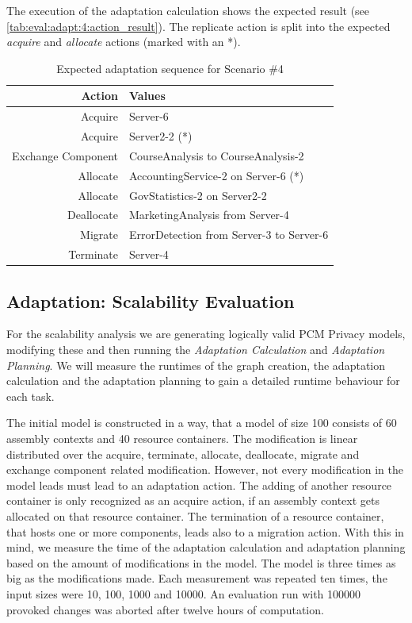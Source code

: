 The execution of the adaptation calculation shows the expected result (see \autoref{tab:eval:adapt:4:action_result}). The replicate action is split into the expected \textit{acquire} and \textit{allocate} actions (marked with an *).

\begin{table}[h]
	\centering
	\begin{tabular}{r | l }
		\hline
		\textbf{Action} & \textbf{Values}\\
		\hline
		Acquire & Server-6\\
		Acquire & Server2-2 (*)\\
		Exchange Component & CourseAnalysis to CourseAnalysis-2\\
		Allocate & AccountingService-2 on Server-6 (*)\\
		Allocate & GovStatistics-2 on Server2-2\\
		Deallocate & MarketingAnalysis from Server-4\\
		Migrate & ErrorDetection from Server-3 to Server-6\\
		Terminate & Server-4\\
		\hline
	\end{tabular}
	\caption{Expected adaptation sequence for Scenario \#4}
	\label{tab:eval:adapt:4:action_result}
\end{table}



\subsection{Adaptation: Scalability Evaluation}

For the scalability analysis we are generating logically valid PCM Privacy models, modifying these and then running the \textit{Adaptation Calculation} and \textit{Adaptation Planning}. We will measure the runtimes of the graph creation, the adaptation calculation and the adaptation planning to gain a detailed runtime behaviour for each task.

The initial model is constructed in a way, that a model of size 100 consists of 60 assembly contexts and 40 resource containers. The modification is linear distributed over the acquire, terminate, allocate, deallocate, migrate and exchange component related modification. However, not every modification in the model leads must lead to an adaptation action. The adding of another resource container is only recognized as an acquire action, if an assembly context gets allocated on that resource container. The termination of a resource container, that hosts one or more components, leads also to a migration action. With this in mind, we measure the time of the adaptation calculation and adaptation planning based on the amount of modifications in the model. The model is three times as big as the modifications made. Each measurement was repeated ten times, the input sizes were 10, 100, 1000 and 10000. An evaluation run with 100000 provoked changes was aborted after twelve hours of computation.

